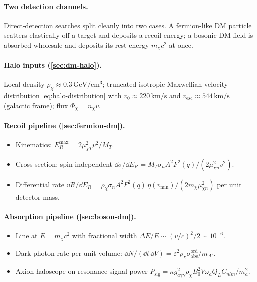 \clearpage
\begin{chaptersummary}

\paragraph{Two detection channels.}
Direct-detection searches split cleanly into two cases. A
fermion-like DM particle scatters elastically off a target and
deposits a recoil energy; a bosonic DM field is absorbed wholesale
and deposits its rest energy $m_\chi c^2$ at once.

\paragraph{Halo inputs (\cref{sec:dm-halo}).}
Local density $\rho_\chi\approx 0.3\,\text{GeV}/\text{cm}^3$;
truncated isotropic Maxwellian velocity distribution
\cref{eq:halo-distribution} with $v_0\approx 220\,\text{km}/\text{s}$
and $v_\text{esc}\approx 544\,\text{km}/\text{s}$ (galactic frame);
flux $\Phi_\chi=n_\chi\bar v$.

\paragraph{Recoil pipeline (\cref{sec:fermion-dm}).}
\begin{itemize}
  \item Kinematics: $E_R^\text{max}=2\mu_{\chi T}^2 v^2/M_T$.
  \item Cross-section: spin-independent
        $\dd\sigma/\dd E_R=M_T\sigma_n A^2 F^2(q)/(2\mu_{\chi n}^2 v^2)$.
  \item Differential rate
        $\dd R/\dd E_R=\rho_\chi\sigma_n A^2 F^2(q)\,\eta(v_\text{min})/(2 m_\chi\mu_{\chi n}^2)$
        per unit detector mass.
\end{itemize}

\paragraph{Absorption pipeline (\cref{sec:boson-dm}).}
\begin{itemize}
  \item Line at $E=m_\chi c^2$ with fractional width
        $\Delta E/E\sim (v/c)^2/2\sim 10^{-6}$.
  \item Dark-photon rate per unit volume:
        $\dd N/(\dd t\,\dd V)=\varepsilon^2\rho_\chi\sigma_\text{abs}^\text{ord}/m_{A'}$.
  \item Axion-haloscope on-resonance signal power
        $P_\text{sig}=\kappa g_{a\gamma\gamma}^2\rho_\chi B_0^2 V \omega_a Q_L C_{nlm}/m_a^2$.
\end{itemize}


\end{chaptersummary}
